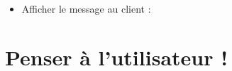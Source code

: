 \begin{english}

\begin{Shaded}
\begin{Highlighting}[]
\OtherTok{(}\OtherTok{,} \OtherTok{,} \OtherTok{);}
\end{Highlighting}
\end{Shaded}

\end{english}

\begin{itemize}
\tightlist
\item
  Afficher le message au client :
\end{itemize}

\begin{english}

\begin{Shaded}
\begin{Highlighting}[]
\NormalTok{(}\NormalTok{)}\OperatorTok{;}
\end{Highlighting}
\end{Shaded}

\end{english}

\hypertarget{penser-uxe0-lutilisateur}{%
\section{Penser à l'utilisateur !}\label{penser-uxe0-lutilisateur}}

